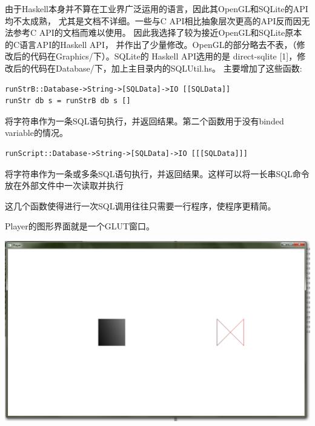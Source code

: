\documentclass[12pt,a4paper]{article}
\begin{document}
\vspace{12mm}\vspace{2mm}

由于Haskell本身并不算在工业界广泛运用的语言，因此其OpenGL和SQLite的API均不太成熟，%
尤其是文档不详细。一些与C API相比抽象层次更高的API反而因无法参考C API的文档而难以使用。%
因此我选择了较为接近OpenGL和SQLite原本的C语言API的Haskell API，%
并作出了少量修改。OpenGL的部分略去不表，（修改后的代码在Graphics/下）。SQLite的%
Haskell API选用的是 direct-sqlite [1]，修改后的代码在Database/下，加上主目录内的SQLUtil.hs。%
主要增加了这些函数:

\vspace{5mm}
\begin{lstlisting}
runStrB::Database->String->[SQLData]->IO [[SQLData]]
runStr db s = runStrB db s []
\end{lstlisting}

将字符串作为一条SQL语句执行，并返回结果。第二个函数用于没有binded variable的情况。

\vspace{5mm}
\begin{lstlisting}
runScript::Database->String->[SQLData]->IO [[[SQLData]]]
\end{lstlisting}

将字符串作为一条或多条SQL语句执行，并返回结果。这样可以将一长串SQL命令放在外部文件中一次读取并执行

\vspace{5mm}
这几个函数使得进行一次SQL调用往往只需要一行程序，使程序更精简。

\newpage
\vspace{12mm}\vspace{2mm}

Player的图形界面就是一个GLUT窗口。	

\vspace{5mm}\noindent\includegraphics[width=\textwidth]{p0.png}\vspace{10mm}
\end{document}
